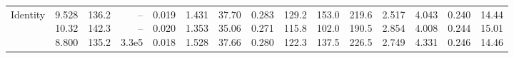 \begin{landscape}
\begin{table}[t]
{\begin{tabular}{@{}lrrrrrrrrrrrrrr@{}}
Identity & \makecell[r]{9.528\\10.32\\8.800} & \makecell[r]{136.2\\142.3\\135.2} & \makecell[r]{--\\--\\3.3e5} & \makecell[r]{0.019\\0.020\\0.018} & \makecell[r]{1.431\\1.353\\1.528} & \makecell[r]{37.70\\35.06\\37.66} & \makecell[r]{0.283\\0.271\\0.280} & \makecell[r]{129.2\\115.8\\122.3} & \makecell[r]{153.0\\102.0\\137.5} & \makecell[r]{219.6\\190.5\\226.5} & \makecell[r]{2.517\\2.854\\2.749} & \makecell[r]{4.043\\4.008\\4.331} & \makecell[r]{0.240\\0.244\\0.246} & \makecell[r]{14.44\\15.01\\14.46} \\

\end{tabular}}
\end{table}
\end{landscape}
